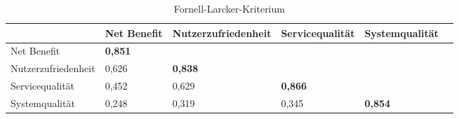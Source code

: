 \begin{table}[h] 
\footnotesize
\caption{Fornell-Larcker-Kriterium}
\label{tab:Fornell-Larcker-Kriterium} 
\begin{tabular}{@{}llllll@{}} \toprule

 & \textbf{Net Benefit} & \textbf{Nutzerzufriedenheit} & \textbf{Servicequalität} & \textbf{Systemqualität} \\ \midrule

 Net Benefit 			& \textbf{0,851}		& 			& 		&  		\\
 
 Nutzerzufriedenheit 	& 0,626 		& \textbf{0,838}		& 		& 			\\

 Servicequalität 		& 0,452 		& 0,629 		& \textbf{0,866}	& 		 \\

 Systemqualität 		& 0,248 		& 0,319 		& 0,345 	& \textbf{0,854} \\ 
 
 \bottomrule
\end{tabular}	
\end{table}












